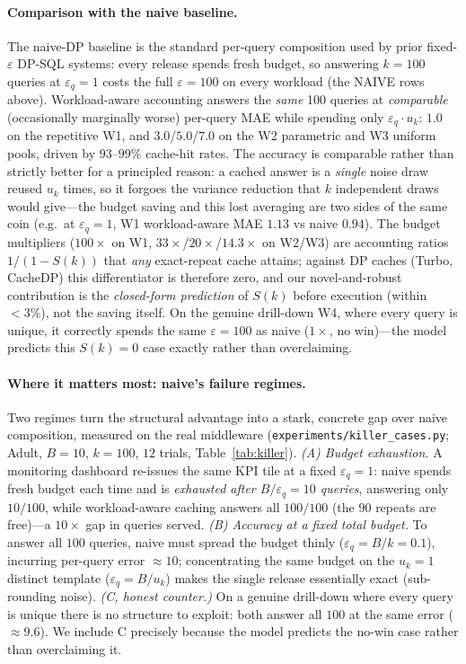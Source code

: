\documentclass[sigconf,nonacm]{acmart}
\newcommand{\eps}{\varepsilon}
\begin{document}
\paragraph{Comparison with the naive baseline.}
The naive-DP baseline is the standard per-query composition used by prior fixed-$\eps$ DP-SQL systems: every release spends fresh budget, so answering $k=100$ queries at $\eps_q=1$ costs the full $\eps=100$ on every workload (the NAIVE rows above). Workload-aware accounting answers the \emph{same} 100 queries at \emph{comparable} (occasionally marginally worse) per-query MAE while spending only $\eps_q\cdot u_k$: $1.0$ on the repetitive W1, and $3.0$/$5.0$/$7.0$ on the W2 parametric and W3 uniform pools, driven by $93$--$99\%$ cache-hit rates. The accuracy is comparable rather than strictly better for a principled reason: a cached answer is a \emph{single} noise draw reused $u_k$ times, so it forgoes the variance reduction that $k$ independent draws would give---the budget saving and this lost averaging are two sides of the same coin (e.g.\ at $\eps_q{=}1$, W1 workload-aware MAE $1.13$ vs naive $0.94$). The budget multipliers ($100\times$ on W1, $33\times$/$20\times$/$14.3\times$ on W2/W3) are accounting ratios $1/(1-S(k))$ that \emph{any} exact-repeat cache attains; against DP caches (Turbo, CacheDP) this differentiator is therefore zero, and our novel-and-robust contribution is the \emph{closed-form prediction} of $S(k)$ before execution (within $<3\%$), not the saving itself. On the genuine drill-down W4, where every query is unique, it correctly spends the same $\eps=100$ as naive ($1\times$, no win)---the model predicts this $S(k)=0$ case exactly rather than overclaiming.

\paragraph{Where it matters most: naive's failure regimes.} Two regimes turn the structural advantage into a stark, concrete gap over naive composition, measured on the real middleware (\texttt{experiments/killer\_cases.py}; Adult, $B{=}10$, $k{=}100$, $12$ trials, Table~\ref{tab:killer}). \emph{(A) Budget exhaustion.} A monitoring dashboard re-issues the same KPI tile at a fixed $\eps_q{=}1$: naive spends fresh budget each time and is \emph{exhausted after $B/\eps_q=10$ queries}, answering only $10/100$, while workload-aware caching answers all $100/100$ (the $90$ repeats are free)---a $10\times$ gap in queries served. \emph{(B) Accuracy at a fixed total budget.} To answer all $100$ queries, naive must spread the budget thinly ($\eps_q=B/k=0.1$), incurring per-query error ${\approx}10$; concentrating the same budget on the $u_k{=}1$ distinct template ($\eps_q=B/u_k$) makes the single release essentially exact (sub-rounding noise). \emph{(C, honest counter.)} On a genuine drill-down where every query is unique there is no structure to exploit: both answer all $100$ at the same error ($\approx 9.6$). We include C precisely because the model predicts the no-win case rather than overclaiming it.
\end{document}
